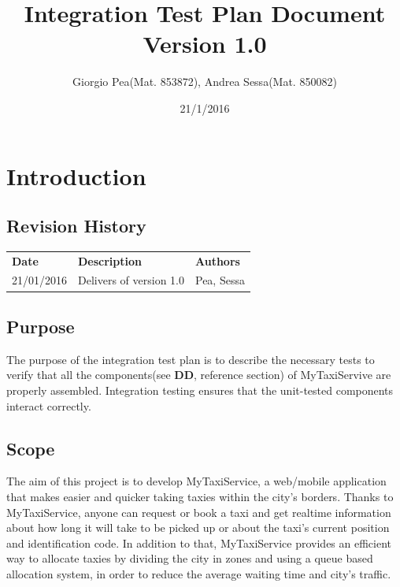 \documentclass[11pt,titlepage]{article} %
\title{\textbf{I}ntegration \textbf{T}est \textbf{P}lan \textbf{D}ocument \\ \vspace{1cm} \large{Version 1.0}}
\author{Giorgio Pea(Mat. 853872), Andrea Sessa(Mat. 850082)}
\date{21/1/2016}
\begin{document}
\maketitle

\newpage

\tableofcontents

\newpage

\section{Introduction}

\subsection{Revision History}
	\begin{table}[h]
	  \centering
	  \begin{tabular}{lll}
	  \textbf{Date} & \textbf{Description} & \textbf{Authors} \\
	    21/01/2016 & Delivers of version 1.0 & Pea, Sessa
	  \end{tabular}
	\end{table}

\subsection{Purpose}
  The purpose of the integration test plan is to describe the necessary tests to verify that all the components(see \textbf{DD}, reference section)
  of MyTaxiServive are properly assembled.
  Integration testing ensures that the unit-tested components interact correctly. \newline
  
\subsection{Scope}
    The aim of this project is to develop MyTaxiService, a web/mobile application that
    makes easier and quicker taking taxies within the city’s borders. Thanks to MyTaxiService,
    anyone can request or book a taxi and get realtime information about how long
    it will take to be picked up or about the taxi’s current position and identification code.
    In addition to that, MyTaxiService provides an efficient way to allocate taxies by dividing
    the city in zones and using a queue based allocation system, in order to reduce the
    average waiting time and city’s traffic.\newline
\end{document}
